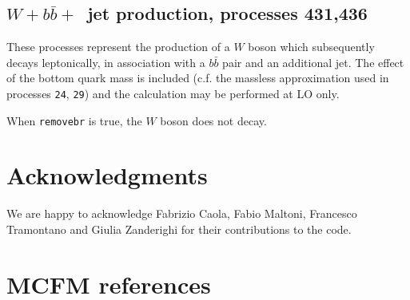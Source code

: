 \documentclass[12pt]{article}
\begin{document}
\subsection{$W+b{\bar b}+$~jet production, processes 431,436}
\label{subsec:wbbjetmassive}

These processes represent the production of a $W$ boson which subsequently
decays leptonically, in association with a $b{\bar b}$ pair and an
additional jet. The effect of the bottom quark mass is included (c.f. the massless approximation
used in processes {\tt 24}, {\tt 29})
and the calculation may be performed at LO only.

When {\tt removebr} is true, the $W$ boson does not decay.


\section*{Acknowledgments}
We are happy to acknowledge Fabrizio Caola, Fabio Maltoni, Francesco Tramontano
and Giulia Zanderighi for their contributions to the code.


\appendix
\section{MCFM references}
\label{MCFMrefs}
\end{document}
